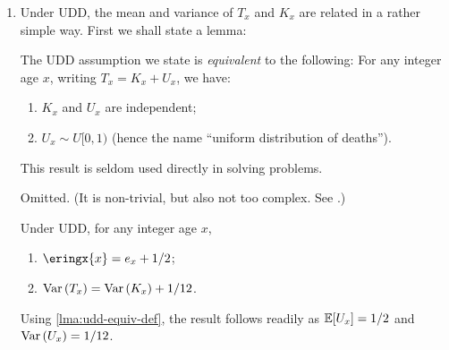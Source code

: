 \begin{enumerate}
\item Under UDD, the mean and variance of \(T_x\) and \(K_x\) are related in a rather simple way.
First we shall state a lemma:
\begin{lemma}
\label{lma:udd-equiv-def}
The UDD assumption we state is \emph{equivalent} to
the following: For any integer age \(x\), writing
\(T_x=K_x+U_x\), we have:
\begin{enumerate}
\item \(K_x\) and \(U_x\) are independent;
\item \(U_x\sim U[0,1)\) (hence the name ``uniform distribution of deaths'').
\end{enumerate}
\end{lemma}

\begin{note}
This result is seldom used directly in solving problems.
\end{note}

\begin{pf}
Omitted. (It is non-trivial, but also not too complex. See \textcite[Section~3.3.1]{dickson2019actuarial}.)
\end{pf}

\begin{proposition}
\label{prp:udd-mean-variance}
Under UDD, for any integer age \(x\),
\begin{enumerate}
\item \(\eringx{x}=e_x+1/2\);
\item \(\operatorname{Var}\qty(T_x)=\operatorname{Var}\qty(K_x)+1/12\).
\end{enumerate}
\end{proposition}

\begin{pf}
Using \cref{lma:udd-equiv-def}, the result follows readily as
\(\mathbb{E}\qty[U_x]=1/2\) and \(\operatorname{Var}\qty(U_x)=1/12\).
\end{pf}


\end{enumerate}
